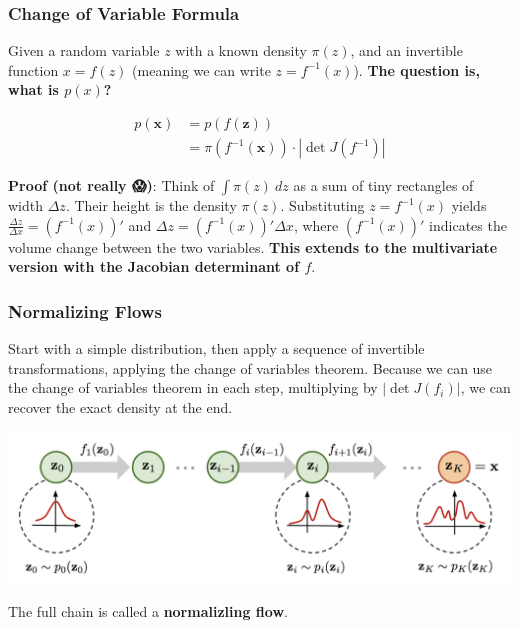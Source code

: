 \documentclass{beamer}
\begin{document}
\begin{frame}
  \frametitle{Change of Variable Formula}

  Given a random variable $z$ with a known density $\pi(z)$, and an invertible
  function $x = f(z)$ (meaning we can write $z = f^{-1}(x)$).  \textbf{The question is,
  what is $p(x)$?}

  \begin{align}
    p(\textbf{x}) &= p(f(\textbf{z})) \\
                  &= \pi(f^{-1}(\textbf{x})) \cdot |\det{J(f^{-1})}|
  \end{align}

  \textbf{Proof (not really {\DejaSans 😱})}: Think of $\int \pi(z)\ dz$ as a
  sum of tiny rectangles of width $\Delta z$. Their height is the density
  $\pi(z)$. Substituting $z = f^{-1}(x)$ yields $\frac{\Delta z}{\Delta x} =
  (f^{-1}(x))'$ and $\Delta z = (f^{-1}(x))' \Delta x$, where $(f^{-1}(x))'$
  indicates the volume change between the two variables. \textbf{This extends
  to the multivariate version with the Jacobian determinant of $f$}.
\end{frame}

\begin{frame}
  \frametitle{Normalizing Flows}

  Start with a simple distribution, then apply a sequence of invertible
  transformations, applying the change of variables theorem. Because we can use
  the change of variables theorem in each step, multiplying by $|\det J(f_i)|$,
  we can recover the exact density at the end.

  \includegraphics[width=1.0\textwidth]{normalizing-flow.png}

  The full chain is called a \textbf{normalizling flow}.
\end{frame}
\end{document}
